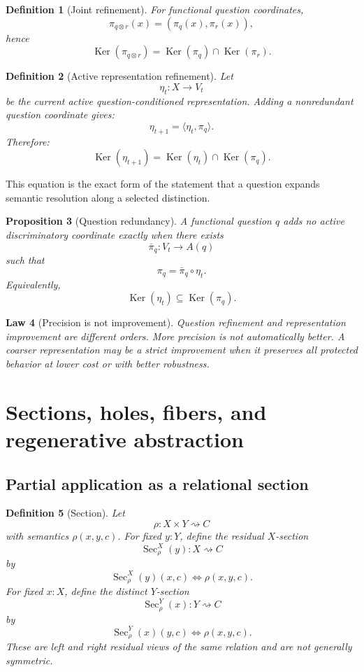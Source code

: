 \documentclass[11pt,oneside]{article}
\newtheorem{definition}{Definition}[section]
\newtheorem{law}[definition]{Law}
\newtheorem{proposition}[definition]{Proposition}
\newcommand{\Ker}{\operatorname{Ker}}
\begin{document}
\begin{definition}[Joint refinement]
For functional question coordinates,
\[
\pi_{q\otimes r}(x)
=
(\pi_q(x),\pi_r(x)),
\]
hence
\[
\boxed{
\Ker(\pi_{q\otimes r})
=
\Ker(\pi_q)\cap\Ker(\pi_r).
}
\]
\end{definition}

\begin{definition}[Active representation refinement]
Let
\[
\eta_t:X\to V_t
\]
be the current active question-conditioned representation.  Adding a nonredundant question coordinate gives:
\[
\boxed{
\eta_{t+1}
=
\langle\eta_t,\pi_q\rangle.
}
\]
Therefore:
\[
\boxed{
\Ker(\eta_{t+1})
=
\Ker(\eta_t)\cap\Ker(\pi_q).
}
\]
\end{definition}

This equation is the exact form of the statement that a question expands semantic resolution along a selected distinction.

\begin{proposition}[Question redundancy]
A functional question \(q\) adds no active discriminatory coordinate exactly when there exists
\[
\bar\pi_q:V_t\to A(q)
\]
such that
\[
\boxed{
\pi_q=\bar\pi_q\circ\eta_t.
}
\]
Equivalently,
\[
\Ker(\eta_t)\subseteq\Ker(\pi_q).
\]
\end{proposition}

\begin{law}[Precision is not improvement]
Question refinement and representation improvement are different orders.  More precision is not automatically better.  A coarser representation may be a strict improvement when it preserves all protected behavior at lower cost or with better robustness.
\end{law}


\section{Sections, holes, fibers, and regenerative abstraction}

\subsection{Partial application as a relational section}

\begin{definition}[Section]
Let
\[
\rho:X\times Y\rightsquigarrow C
\]
with semantics \(\rho(x,y,c)\).  For fixed \(y:Y\), define the residual \(X\)-section
\[
\boxed{
\operatorname{Sec}^{X}_{\rho}(y):X\rightsquigarrow C
}
\]
by
\[
\operatorname{Sec}^{X}_{\rho}(y)(x,c)
\iff
\rho(x,y,c).
\]
For fixed \(x:X\), define the distinct \(Y\)-section
\[
\boxed{
\operatorname{Sec}^{Y}_{\rho}(x):Y\rightsquigarrow C
}
\]
by
\[
\operatorname{Sec}^{Y}_{\rho}(x)(y,c)
\iff
\rho(x,y,c).
\]
These are left and right residual views of the same relation and are not generally symmetric.
\end{definition}
\end{document}
